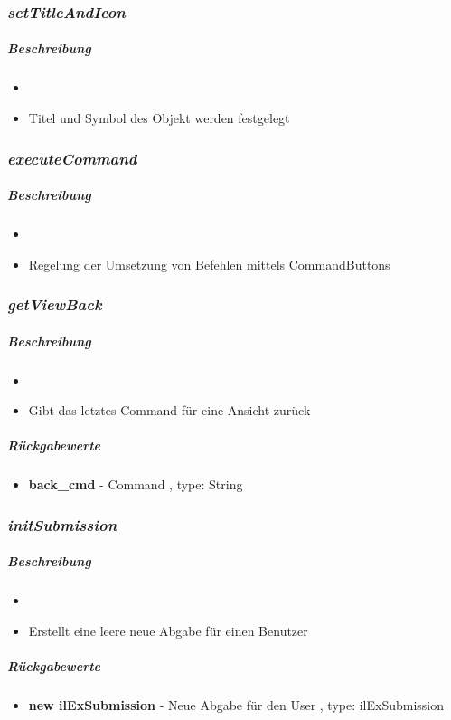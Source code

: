 \subsubsection*{\textit{setTitleAndIcon}}\label{setTitleAndIconTGUI}
\subparagraph{Beschreibung}
\begin{itemize}
	\item[] \noindent{}
	\item[] Titel und Symbol des Objekt werden festgelegt
\end{itemize}

\subsubsection*{\textit{executeCommand}}\label{executeCommandTGUI}
\subparagraph{Beschreibung}
\begin{itemize}
	\item[] \noindent{}
	\item[] Regelung der Umsetzung von Befehlen mittels CommandButtons
\end{itemize}

\subsubsection*{\textit{getViewBack}}\label{getViewBackTGUI}
\subparagraph{Beschreibung}
\begin{itemize}
	\item[] \noindent{}
	\item[] Gibt das letztes Command für eine Ansicht zurück
\end{itemize}
\subparagraph{Rückgabewerte}
\begin{itemize}
	\item[] \textbf{back\_cmd} - Command , type: String
\end{itemize}

\subsubsection*{\textit{initSubmission}}\label{initSubmissionTGUI}
\subparagraph{Beschreibung}
\begin{itemize}
	\item[] \noindent{}
	\item[] Erstellt eine leere neue Abgabe für einen Benutzer
\end{itemize}
\subparagraph{Rückgabewerte}
\begin{itemize}
	\item[] \textbf{new ilExSubmission} - Neue Abgabe für den User , type: ilExSubmission
\end{itemize}

